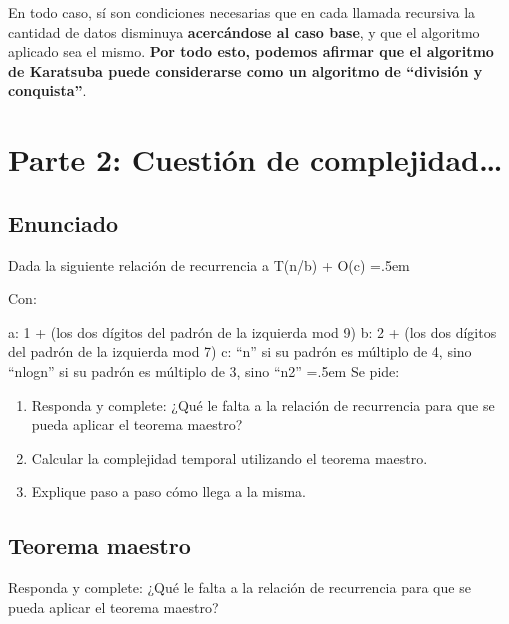 \documentclass[titlepage,a4paper]{article}
\newenvironment{lcverbatim}
 {\SaveVerbatim{cverb}}
 {\endSaveVerbatim
  \flushleft\fboxrule=0pt\fboxsep=.5em
  \colorbox{cverbbg}{%
    \makebox[\dimexpr\linewidth-2\fboxsep][l]{\BUseVerbatim{cverb}}%
  }
  \endflushleft
}
\begin{document}
En todo caso, sí son condiciones necesarias que en cada llamada recursiva la cantidad de datos disminuya \textbf{acercándose al caso base}, y que el algoritmo aplicado sea el mismo. \textbf{Por todo esto, podemos afirmar que el algoritmo de Karatsuba puede considerarse como un algoritmo de “división y conquista”}.





\newpage\section{Parte 2: Cuestión de complejidad…}\label{sec:parte2}

\subsection{Enunciado}

Dada la siguiente relación de recurrencia
\begin{lcverbatim}
    a T(n/b) + O(c)
\end{lcverbatim}

Con:

\begin{lcverbatim}
a: 1 + (los dos dígitos del padrón de la izquierda mod 9)
b: 2 + (los dos dígitos del padrón de la izquierda mod 7)
c: “n” si su padrón es múltiplo de 4, 
   sino “nlogn” si su padrón es múltiplo de 3,
   sino “n2”  \end{lcverbatim}
\noindent Se pide:
\begin{enumerate}
\item Responda y complete: ¿Qué le falta a la relación de recurrencia para que se pueda aplicar el teorema maestro?

\item Calcular la complejidad temporal utilizando el teorema maestro.

\item Explique paso a paso cómo llega a la misma.

\end{enumerate}

\newpage\subsection{Teorema maestro}
\begin{tcolorbox}[colback=blue!5!white,colframe=blue!75!black,title=Enunciado 2.1]
    Responda y complete: ¿Qué le falta a la relación de recurrencia para que se pueda aplicar el teorema maestro?
\end{tcolorbox}
\end{document}
